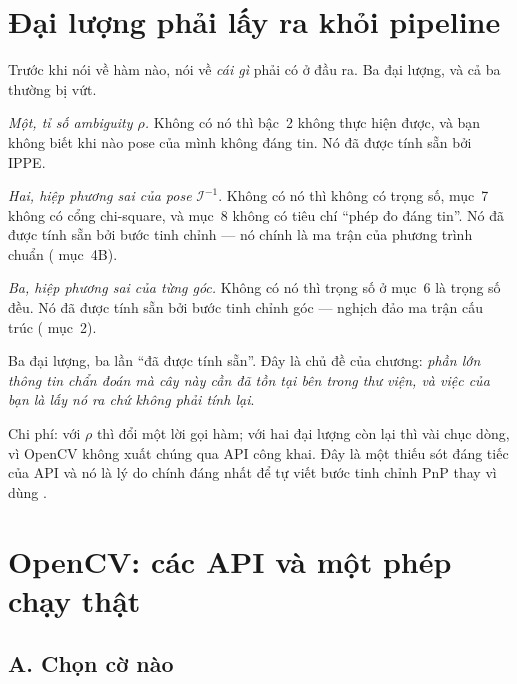 \documentclass[../../marker.tex]{subfiles}
\begin{document}
\section{Đại lượng phải lấy ra khỏi pipeline}

Trước khi nói về hàm nào, nói về \emph{cái gì} phải có ở đầu ra. Ba đại lượng, và cả ba thường bị vứt.

\emph{Một, tỉ số ambiguity \(\rho\).} Không có nó thì  bậc~2 không thực hiện được, và bạn không biết khi nào pose của mình không đáng tin. Nó đã được tính sẵn bởi IPPE.

\emph{Hai, hiệp phương sai của pose} \(\mathcal{I}^{-1}\). Không có nó thì  không có trọng số,  mục~7 không có cổng chi-square, và  mục~8 không có tiêu chí ``phép đo đáng tin''. Nó đã được tính sẵn bởi bước tinh chỉnh --- nó chính là ma trận của phương trình chuẩn ( mục~4B).

\emph{Ba, hiệp phương sai của từng góc.} Không có nó thì trọng số ở  mục~6 là trọng số đều. Nó đã được tính sẵn bởi bước tinh chỉnh góc --- nghịch đảo ma trận cấu trúc ( mục~2).

Ba đại lượng, ba lần ``đã được tính sẵn''. Đây là chủ đề của chương: \emph{phần lớn thông tin chẩn đoán mà cây này cần đã tồn tại bên trong thư viện, và việc của bạn là lấy nó ra chứ không phải tính lại}.

Chi phí: với \(\rho\) thì đổi một lời gọi hàm; với hai đại lượng còn lại thì vài chục dòng, vì OpenCV không xuất chúng qua API công khai. Đây là một thiếu sót đáng tiếc của API và nó là lý do chính đáng nhất để tự viết bước tinh chỉnh PnP thay vì dùng .

\section{OpenCV: các API và một phép chạy thật}

\subsection{A. Chọn cờ \texorpdfstring{}{SOLVEPNP} nào}
\end{document}
